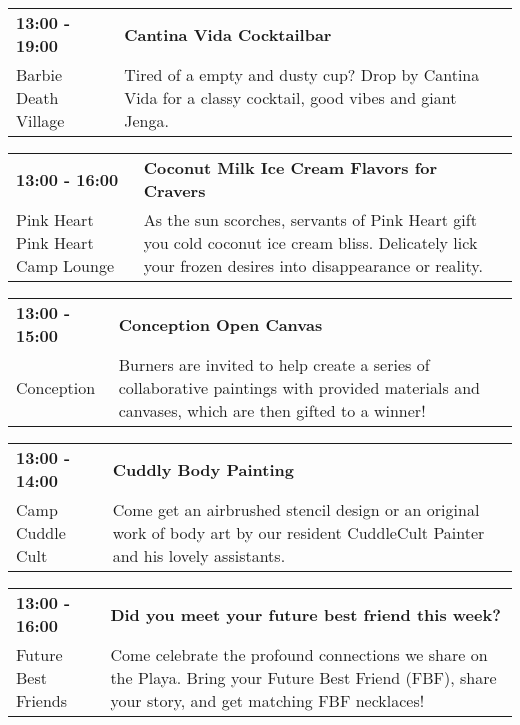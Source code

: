 \begin{tabular}{ p{1in} p{2.2in} }
    \textbf{13:00 - 19:00} & \textbf{Cantina Vida Cocktailbar} \\
    Barbie Death Village \newline  & Tired of a empty and dusty cup? Drop by Cantina Vida for a classy cocktail, good vibes and giant Jenga. \\
    \hline 
\end{tabular}
    
\begin{tabular}{ p{1in} p{2.2in} }
    \textbf{13:00 - 16:00} & \textbf{Coconut Milk Ice Cream Flavors for Cravers} \\
    Pink Heart \newline Pink Heart Camp Lounge & As the sun scorches, servants of Pink Heart gift you cold coconut ice cream bliss. Delicately lick your frozen desires into disappearance or reality. \\
    \hline 
\end{tabular}
    
\begin{tabular}{ p{1in} p{2.2in} }
    \textbf{13:00 - 15:00} & \textbf{Conception Open Canvas} \\
    Conception \newline  & Burners are invited to help create a series of collaborative paintings with provided materials and canvases, which are then gifted to a winner! \\
    \hline 
\end{tabular}
    
\begin{tabular}{ p{1in} p{2.2in} }
    \textbf{13:00 - 14:00} & \textbf{Cuddly Body Painting } \\
    Camp Cuddle Cult \newline  & Come get an airbrushed stencil design or an original work of body art by our resident CuddleCult Painter and his lovely assistants. \\
    \hline 
\end{tabular}
    
\begin{tabular}{ p{1in} p{2.2in} }
    \textbf{13:00 - 16:00} & \textbf{Did you meet your future best friend this week?} \\
    Future Best Friends \newline  & Come celebrate the profound connections we share on the Playa. Bring your Future Best Friend (FBF), share your story, and get matching FBF necklaces! \\
    \hline 
\end{tabular}
    
